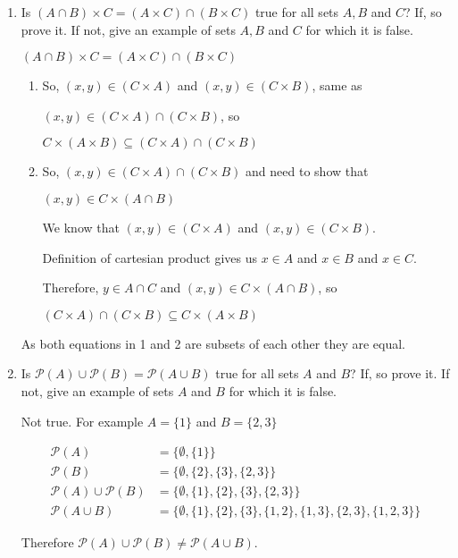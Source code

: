 \documentclass[11pt]{article}
\begin{document}
\begin{enumerate}[label=(\roman*)]
	\item Is $(A\cap B) \times C = (A \times C) \cap (B \times C)$ true for all sets $A,B$ and $C$? If, so prove it. If not, give an example of sets $A,B$ and $C$ for which it is false.

	$(A\cap B) \times C = (A \times C) \cap (B \times C)$

	\begin{enumerate}[label=\arabic*]
		\item So, $(x,y) \in (C\times A)$ and $(x,y)\in(C\times B)$,
		same as

		$(x,y)\in(C\times A) \cap (C \times B)$, so

		$C \times (A \times B) \subseteq (C \times A)\cap (C \times B)$

		\item So, $(x,y) \in (C \times A) \cap (C \times B)$ and need to show that

		$(x,y) \in C \times (A \cap B)$

		We know that $(x,y)\in (C \times A)$ and $(x,y)\in (C \times B)$.

		Definition of cartesian product gives us $x \in A$ and $x \in B$ and $x \in C$.

		Therefore, $y \in A \cap C$ and $(x,y)\in C \times (A \cap B)$, so

		$(C \times A)\cap(C \times B) \subseteq C \times (A \times B)$
	\end{enumerate}

	As both equations in 1 and 2 are subsets of each other they are equal.

	\item Is $\mathcal{P}(A)\cup \mathcal{P}(B) = \mathcal{P}(A \cup B)$ true for all sets $A$ and $B$? If, so prove it. If not, give an example of sets $A$ and $B$ for which it is false.

	Not true. For example $A = \{1\}$ and $B=\{2,3\}$

	\begin{align*}
		\mathcal{P}(A) &= \{\emptyset,\{1\}\} \\
		\mathcal{P}(B) &= \{\emptyset,\{2\},\{3\},\{2,3\}\} \\
		\mathcal{P}(A) \cup \mathcal{P}(B) &= \{\emptyset,\{1\},\{2\},\{3\},\{2,3\}\} \\
		\mathcal{P}(A \cup B) &= \{\emptyset,\{1\},\{2\},\{3\},\{1,2\},\{1,3\},\{2,3\},\{1,2,3\}\}
	\end{align*}

	Therefore $\mathcal{P}(A)\cup \mathcal{P}(B) \not= \mathcal{P}(A \cup B)$.
\end{enumerate}
\end{document}

